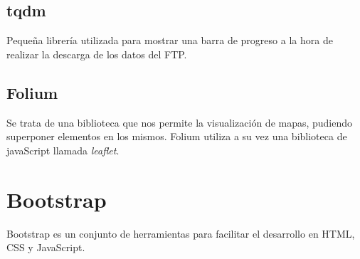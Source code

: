 	\subsection{tqdm}\label{tqdm}
Pequeña librería utilizada para mostrar una barra de progreso a la hora de realizar la descarga de los datos del FTP.
	\subsection{Folium}
Se trata de una biblioteca que nos permite la visualización de mapas, pudiendo superponer elementos en los mismos. Folium utiliza a su vez una biblioteca de javaScript llamada \emph{leaflet}.

	\section{Bootstrap}
Bootstrap es un conjunto de herramientas para facilitar el desarrollo en HTML, CSS y JavaScript.
